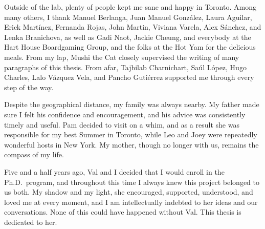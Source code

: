 \documentclass{ut-thesis}
\begin{document}
\begin{preliminary}
\begin{acknowledgements}
Outside of the lab, plenty of people kept me sane and happy in Toronto. Among many others, I thank Manuel Berlanga, Juan Manuel Gonz\'{a}lez, Laura Aguilar, Erick Mart\'{i}nez, Fernanda Rojas, John Martin, Viviana Varela, Alex S\'{a}nchez, and Lenka Branichova, as well as Gadi Naot, Jackie Cheung, and everybody at the Hart House Boardgaming Group, and the folks at the Hot Yam for the delicious meals. From my lap, Mushi the Cat closely supervised the writing of many paragraphs of this thesis. From afar, Tajbilab Charnichart, Sa\'{u}l L\'{o}pez, Hugo Charles, Lalo V\'{a}zquez Vela, and Pancho Guti\'{e}rrez supported me through every step of the way.

Despite the geographical distance, my family was always nearby. My father made sure I felt his confidence and encouragement, and his advice was consistently timely and useful. Pam decided to visit on a whim, and as a result she was responsible for my best Summer in Toronto, while Leo and Joey were repeatedly wonderful hosts in New York. My mother, though no longer with us, remains the compass of my life.

Five and a half years ago, Val and I decided that I would enroll in the Ph.D.\ program, and throughout this time I always knew this project belonged to us both. My shadow and my light, she encouraged, supported, understood, and loved me at every moment, and I am intellectually indebted to her ideas and our conversations. None of this could have happened without Val. This thesis is dedicated to her.

\end{acknowledgements}

\tableofcontents
\listoftables
\listoffigures

\end{preliminary}













\appendix





\end{document}
